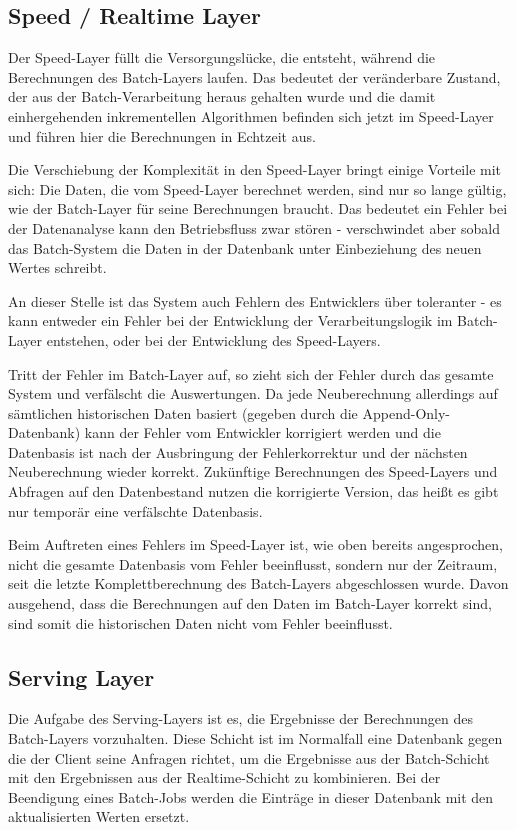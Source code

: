 \documentclass[a4paper,11pt]{scrartcl}
\begin{document}
  \subsection{Speed / Realtime Layer}
  Der Speed-Layer füllt die Versorgungslücke, die entsteht, während die
  Berechnungen des Batch-Layers laufen. Das bedeutet der veränderbare Zustand,
  der aus der Batch-Verarbeitung heraus gehalten wurde und die damit
  einhergehenden inkrementellen Algorithmen befinden sich jetzt im Speed-Layer
  und führen hier die Berechnungen in Echtzeit aus.

  Die Verschiebung der Komplexität in den Speed-Layer bringt einige Vorteile mit
  sich: Die Daten, die vom Speed-Layer berechnet werden, sind nur so lange
  gültig, wie der Batch-Layer für seine Berechnungen braucht. Das bedeutet ein
  Fehler bei der Datenanalyse kann den Betriebsfluss zwar stören - verschwindet
  aber sobald das Batch-System die Daten in der Datenbank unter Einbeziehung des
  neuen Wertes schreibt.

  An dieser Stelle ist das System auch Fehlern des Entwicklers über toleranter -
  es kann entweder ein Fehler bei der Entwicklung der Verarbeitungslogik im
  Batch-Layer entstehen, oder bei der Entwicklung des Speed-Layers.

  Tritt der Fehler im Batch-Layer auf, so zieht sich der Fehler durch das
  gesamte System und verfälscht die Auswertungen. Da jede Neuberechnung
  allerdings auf sämtlichen historischen Daten basiert (gegeben durch die
  Append-Only-Datenbank) kann der Fehler vom Entwickler korrigiert werden und
  die Datenbasis ist nach der Ausbringung der Fehlerkorrektur und der nächsten
  Neuberechnung wieder korrekt. Zukünftige Berechnungen des Speed-Layers und
  Abfragen auf den Datenbestand nutzen die korrigierte Version, das heißt es
  gibt nur temporär eine verfälschte Datenbasis.

  Beim Auftreten eines Fehlers im Speed-Layer ist, wie oben bereits
  angesprochen, nicht die gesamte Datenbasis vom Fehler beeinflusst, sondern
  nur der Zeitraum, seit die letzte Komplettberechnung des Batch-Layers
  abgeschlossen wurde. Davon ausgehend, dass die Berechnungen auf den Daten im
  Batch-Layer korrekt sind, sind somit die historischen Daten nicht vom Fehler
  beeinflusst.

  \subsection{Serving Layer}
  Die Aufgabe des Serving-Layers ist es, die Ergebnisse der Berechnungen des
  Batch-Layers vorzuhalten. Diese Schicht ist im Normalfall eine Datenbank
  gegen die der Client seine Anfragen richtet, um die Ergebnisse aus der
  Batch-Schicht mit den Ergebnissen aus der Realtime-Schicht zu kombinieren.
  Bei der Beendigung eines Batch-Jobs werden die Einträge in dieser Datenbank
  mit den aktualisierten Werten ersetzt.
\end{document}
